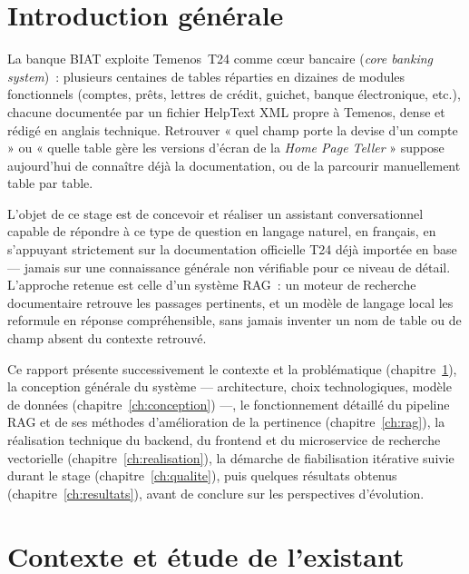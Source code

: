 ﻿\documentclass[12pt,a4paper]{report}
\begin{document}
\tableofcontents
\listoffigures
\listoftables


\chapter*{Introduction générale}

La banque BIAT exploite Temenos~T24 comme cœur bancaire (\emph{core banking system})~: plusieurs centaines de tables réparties en dizaines de modules fonctionnels (comptes, prêts, lettres de crédit, guichet, banque électronique, etc.), chacune documentée par un fichier HelpText XML propre à Temenos, dense et rédigé en anglais technique. Retrouver « quel champ porte la devise d'un compte » ou « quelle table gère les versions d'écran de la \emph{Home Page Teller} » suppose aujourd'hui de connaître déjà la documentation, ou de la parcourir manuellement table par table.

L'objet de ce stage est de concevoir et réaliser un assistant conversationnel capable de répondre à ce type de question en langage naturel, en français, en s'appuyant strictement sur la documentation officielle T24 déjà importée en base --- jamais sur une connaissance générale non vérifiable pour ce niveau de détail. L'approche retenue est celle d'un système RAG~: un moteur de recherche documentaire retrouve les passages pertinents, et un modèle de langage local les reformule en réponse compréhensible, sans jamais inventer un nom de table ou de champ absent du contexte retrouvé.

Ce rapport présente successivement le contexte et la problématique (chapitre~\ref{ch:contexte}), la conception générale du système --- architecture, choix technologiques, modèle de données (chapitre~\ref{ch:conception}) ---, le fonctionnement détaillé du pipeline RAG et de ses méthodes d'amélioration de la pertinence (chapitre~\ref{ch:rag}), la réalisation technique du backend, du frontend et du microservice de recherche vectorielle (chapitre~\ref{ch:realisation}), la démarche de fiabilisation itérative suivie durant le stage (chapitre~\ref{ch:qualite}), puis quelques résultats obtenus (chapitre~\ref{ch:resultats}), avant de conclure sur les perspectives d'évolution.

\chapter{Contexte et étude de l'existant}
\label{ch:contexte}
\end{document}
